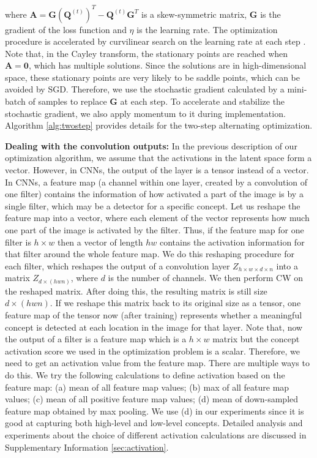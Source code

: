 \documentclass{article}
\begin{document}
where $\mathbf{A}=\mathbf{G}(\mathbf{Q}^{(t)})^T-\mathbf{Q}^{(t)}\mathbf{G}^T$ is a skew-symmetric matrix, $\mathbf{G}$ is the gradient of the loss function and $\eta$ is the learning rate. The optimization procedure is accelerated by curvilinear search on the learning rate at each step \cite{wen2013feasible}. Note that, in the Cayley transform, the stationary points are reached when $\mathbf{A}=\mathbf{0}$, which has multiple solutions. Since the solutions are in high-dimensional space, these stationary points are very likely to be saddle points, which can be avoided by SGD. Therefore, we use the stochastic gradient calculated by a mini-batch of samples to replace $\mathbf{G}$ at each step. To accelerate and stabilize the stochastic gradient, we also apply momentum to it during implementation. Algorithm \ref{alg:twostep} provides details for the two-step alternating optimization.

\textbf{Dealing with the convolution outputs:} In the previous description of our optimization algorithm, we assume that the activations in the latent space form a vector. However, in CNNs, the output of the layer is a tensor instead of a vector. In CNNs, a feature map (a channel within one layer, created by a convolution of one filter) contains the information of how activated a part of the image is by a single filter, which may be a detector for a specific concept. Let us reshape the feature map into a vector, where each element of the vector represents how much one part of the image is activated by the filter. Thus, if the feature map for one filter is $h \times w$ then a vector of length $hw$ contains the activation information for that filter around the whole feature map. We do this reshaping procedure for each filter, which reshapes the output of a convolution layer $Z_{h\times w \times d \times n}$ into a matrix $Z_{d\times(hwn)}$, where $d$ is the number of channels. We then perform CW on the reshaped matrix. After doing this, the resulting matrix is still size $d\times(hwn)$. If we reshape this matrix back to its original size as a tensor, one feature map of the tensor now (after training) represents whether a meaningful concept is detected at each location in the image for that layer. Note that, now the output of a filter is a feature map which is a $h\times w$ matrix but the concept activation score we used in the optimization problem is a scalar. Therefore, we need to get an activation value from the feature map. There are multiple ways to do this. We try the following calculations to define activation based on the feature map: (a) mean of all feature map values; (b) max of all feature map values; (c) mean of all positive feature map values; (d) mean of down-sampled feature map obtained by max pooling.  We use (d) in our experiments since it is good at capturing both high-level and low-level concepts. Detailed analysis and experiments about the choice of different activation calculations are discussed in Supplementary Information \ref{sec:activation}.
\end{document}
